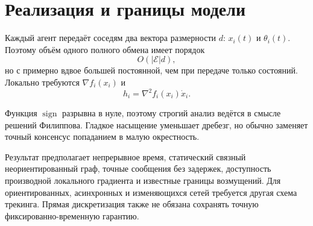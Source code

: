 \section{Реализация и границы модели}

Каждый агент передаёт соседям два вектора размерности \(d\):
\(x_i(t)\) и \(\theta_i(t)\). Поэтому объём одного полного обмена
имеет порядок
\[
    O(|\mathcal E|d),
\]
но с примерно вдвое большей постоянной, чем при передаче только
состояний. Локально требуются \(\nabla f_i(x_i)\) и
\[
    h_i=\nabla^2f_i(x_i)\dot x_i.
\]

Функция \(\operatorname{sign}\) разрывна в нуле, поэтому строгий
анализ ведётся в смысле решений Филиппова. Гладкое насыщение уменьшает
дребезг, но обычно заменяет точный консенсус попаданием в малую
окрестность.

Результат предполагает непрерывное время, статический связный
неориентированный граф, точные сообщения без задержек, доступность
производной локального градиента и известные границы возмущений. Для
ориентированных, асинхронных и изменяющихся сетей требуется другая
схема трекинга. Прямая дискретизация также не обязана сохранять
точную фиксированно-временную гарантию.
